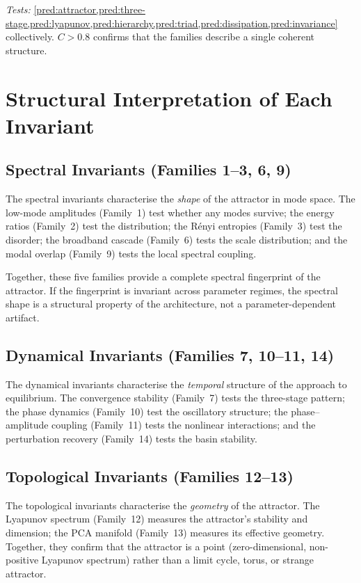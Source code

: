 \documentclass[11pt,twoside,openright]{book}
\theoremstyle{definition}
\theoremstyle{plain}
\theoremstyle{definition}
\theoremstyle{remark}
\begin{document}
\noindent\emph{Tests:} \cref{pred:attractor,pred:three-stage,pred:lyapunov,pred:hierarchy,pred:triad,pred:dissipation,pred:invariance} collectively. \(C > 0.8\) confirms that the families describe a single coherent structure.


\chapter{Structural Interpretation of Each Invariant}\label{ch:interpretation}

\section{Spectral Invariants (Families 1--3, 6, 9)}

The spectral invariants characterise the \emph{shape} of the attractor in mode space. The low-mode amplitudes (Family~1) test whether any modes survive; the energy ratios (Family~2) test the distribution; the R\'{e}nyi entropies (Family~3) test the disorder; the broadband cascade (Family~6) tests the scale distribution; and the modal overlap (Family~9) tests the local spectral coupling.

Together, these five families provide a complete spectral fingerprint of the attractor. If the fingerprint is invariant across parameter regimes, the spectral shape is a structural property of the architecture, not a parameter-dependent artifact.

\section{Dynamical Invariants (Families 7, 10--11, 14)}

The dynamical invariants characterise the \emph{temporal} structure of the approach to equilibrium. The convergence stability (Family~7) tests the three-stage pattern; the phase dynamics (Family~10) test the oscillatory structure; the phase--amplitude coupling (Family~11) tests the nonlinear interactions; and the perturbation recovery (Family~14) tests the basin stability.

\section{Topological Invariants (Families 12--13)}

The topological invariants characterise the \emph{geometry} of the attractor. The Lyapunov spectrum (Family~12) measures the attractor's stability and dimension; the PCA manifold (Family~13) measures its effective geometry. Together, they confirm that the attractor is a point (zero-dimensional, non-positive Lyapunov spectrum) rather than a limit cycle, torus, or strange attractor.
\end{document}
